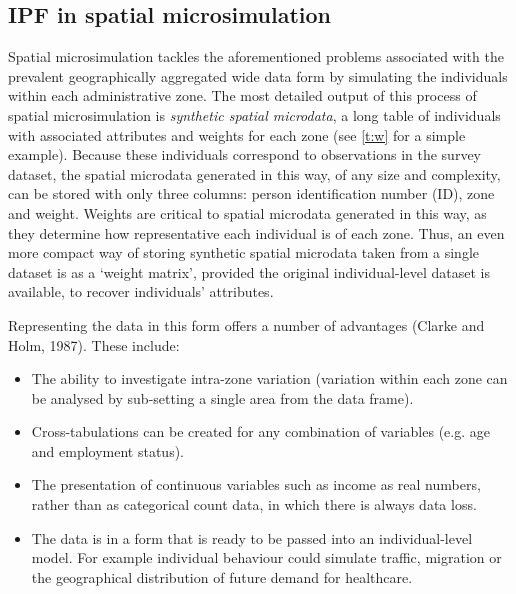 \documentclass[a4paper,10pt]{article}
\begin{document}
\subsection{IPF in spatial microsimulation}
Spatial microsimulation tackles the aforementioned problems associated
with the prevalent geographically aggregated wide data form by simulating
the individuals within each administrative zone. The most detailed output of this process of 
spatial microsimulation is \emph{synthetic spatial microdata}, a long table of individuals with 
associated attributes and weights for each zone (see \cref{t:w} %
 for a simple example). 
Because these individuals correspond to observations in the survey dataset,
the spatial microdata generated in this way, of any size and complexity,
can be stored with only three columns: person identification number (ID),
zone and weight. Weights are critical to spatial microdata generated in this way, as they 
determine how representative each individual is of each zone. Thus, an even more compact way 
of storing synthetic spatial microdata taken from a single dataset is as a `weight matrix',
provided the original individual-level dataset is available, to recover individuals'
attributes.

Representing the data in this form offers a number of advantages
(Clarke and Holm, 1987). These include:
\begin{itemize}
 \item The ability to investigate intra-zone variation (variation within each zone can be analysed
 by sub-setting a single area from the data frame).
\item Cross-tabulations can be created for any combination of variables (e.g. age and employment status).
\item The presentation of continuous variables such as income as real numbers, 
rather than as categorical count data, in which there is always data loss.
\item The data is in a form that is ready to be passed into an individual-level model.
For example individual behaviour could simulate traffic, migration or the geographical distribution of future demand for healthcare.
\end{itemize}
\end{document}
